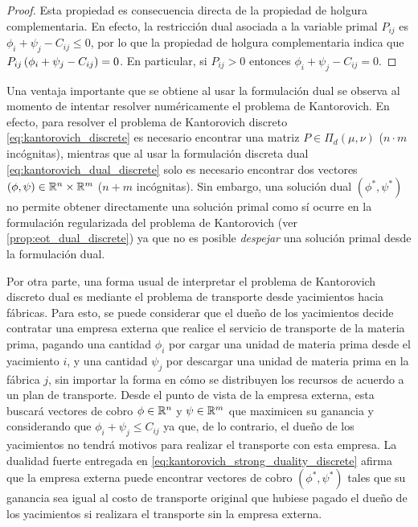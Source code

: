 \begin{proof}
	Esta propiedad es consecuencia directa de la propiedad de holgura complementaria. En efecto, la restricción dual asociada a la variable primal $P_{ij}$ es $\phi_i + \psi_j - C_{ij}\leq 0$, por lo que la propiedad de holgura complementaria indica que $P_{ij}\left(\phi_i + \psi_j - C_{ij}\right) = 0$. En particular, si $P_{ij}>0$ entonces $\phi_i + \psi_j - C_{ij} = 0$.
\end{proof}

Una ventaja importante que se obtiene al usar la formulación dual se observa al momento de intentar resolver numéricamente el problema de Kantorovich. En efecto, para resolver el problema de Kantorovich discreto \eqref{eq:kantorovich_discrete} es necesario encontrar una matriz $P\in\Pi_d(\mu,\nu)$ ($n\cdot m$ incógnitas), mientras que al usar la formulación discreta dual \eqref{eq:kantorovich_dual_discrete} solo es necesario encontrar dos vectores $(\phi,\psi)\in\mathbb{R}^n\times\mathbb{R}^m$ ($n+m$ incógnitas). Sin embargo, una solución dual $(\phi^*,\psi^*)$ no permite obtener directamente una solución primal como sí ocurre en la formulación regularizada del problema de Kantorovich (ver \autoref{prop:eot_dual_discrete}) ya que no es posible \textit{despejar} una solución primal desde la formulación dual.

Por otra parte, una forma usual de interpretar el problema de Kantorovich discreto dual es mediante el problema de transporte desde yacimientos hacia fábricas. Para esto, se puede considerar que el dueño de los yacimientos decide contratar una empresa externa que realice el servicio de transporte de la materia prima, pagando una cantidad $\phi_i$ por cargar una unidad de materia prima desde el yacimiento $i$, y una cantidad $\psi_j$ por descargar una unidad de materia prima en la fábrica $j$, sin importar la forma en cómo se distribuyen los recursos de acuerdo a un plan de transporte. Desde el punto de vista de la empresa externa, esta buscará vectores de cobro $\phi\in\mathbb{R}^n$ y $\psi\in\mathbb{R}^m$ que maximicen su ganancia y considerando que $\phi_i+\psi_j\leq C_{ij}$ ya que, de lo contrario, el dueño de los yacimientos no tendrá motivos para realizar el transporte con esta empresa. La dualidad fuerte entregada en \eqref{eq:kantorovich_strong_duality_discrete} afirma que la empresa externa puede encontrar vectores de cobro $(\phi^*,\psi^*)$ tales que su ganancia sea igual al costo de transporte original que hubiese pagado el dueño de los yacimientos si realizara el transporte sin la empresa externa.

